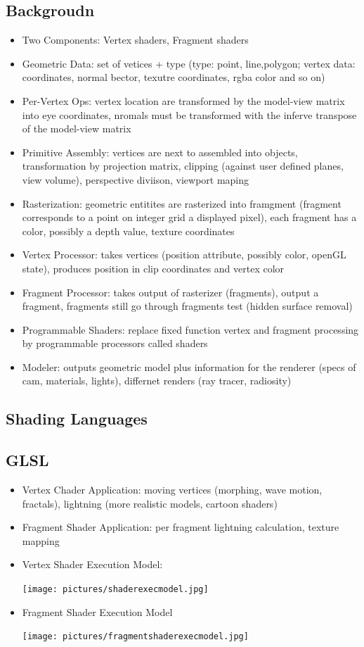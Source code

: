 \documentclass[11pt,a4paper]{article}
\begin{document}
	\subsection{Backgroudn}
	\begin{itemize}
		\item Two Components: Vertex shaders, Fragment shaders
		\item Geometric Data: set of vetices + type (type: point, line,polygon; vertex data: coordinates, normal bector, texutre coordinates, rgba color and so on)
		\item Per-Vertex Ops: vertex location are transformed by the model-view matrix into eye coordinates, nromals must be transformed with the inferve transpose of the model-view matrix
		\item Primitive Assembly: vertices are next to assembled into objects, transformation by projection matrix, clipping (against user defined planes, view volume), perspective diviison, viewport maping
		\item Rasterization: geometric entitites are rasterized into framgment (fragment corresponds to a point on integer grid a displayed pixel), each fragment has a color, possibly a depth value, texture coordinates
		\item Vertex Processor: takes vertices (position attribute, possibly color, openGL state), produces position in clip coordinates and vertex color
		\item Fragment Processor: takes output of rasterizer (fragments), output a fragment, fragments still go through fragments test (hidden surface removal)
		\item Programmable Shaders: replace fixed function vertex and fragment processing by programmable processors called shaders
		\item Modeler: outputs geometric model plus information for the renderer (specs of cam, materials, lights), differnet renders (ray tracer, radiosity)
	\end{itemize}
	\subsection{Shading Languages}
	\subsection{GLSL}
	\begin{itemize}
		\item Vertex Chader Application: moving vertices (morphing, wave motion, fractals), lightning (more realistic models, cartoon shaders)
		\item Fragment Shader Application: per fragment lightning calculation, texture mapping
		\item Vertex Shader Execution Model:
		\begin{center}
			\texttt{[image: pictures/shaderexecmodel.jpg]}
		\end{center}
		\item Fragment Shader Execution Model
		\begin{center}
			\texttt{[image: pictures/fragmentshaderexecmodel.jpg]}
		\end{center}
	\end{itemize}
\end{document}
